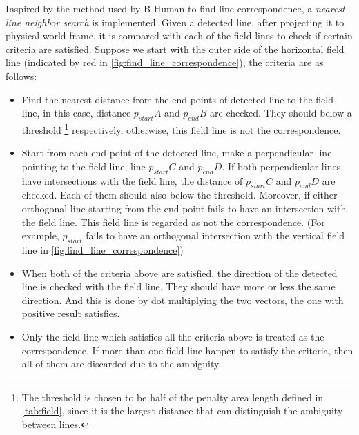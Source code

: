 Inspired by the method used by B-Human \cite{Bhuman} to find line correspondence, a \textit{nearest line neighbor search} is implemented. Given a detected line, after projecting it to physical world frame, it is compared with each of the field lines to check if certain criteria are satisfied. Suppose we start with the outer side of the horizontal field line (indicated by red in
\autoref{fig:find_line_correspondence}), the criteria are as follows:
\begin{itemize}
  \item Find the nearest distance from the end points of detected line to the field line, in this case, distance $p_{start}A$ and $p_{end}B$ are checked. They should below a threshold \footnote{The threshold is chosen to be half of the penalty area length defined in \autoref{tab:field}, since it is the largest distance that can distinguish the ambiguity between lines.} respectively, otherwise, this field line is not the correspondence.
  \item Start from each end point of the detected line, make a perpendicular line pointing to the field line, \ie line $p_{start}C$ and $p_{end}D$. If both perpendicular lines have intersections with the field line, the distance of $p_{start}C$ and $p_{end}D$ are checked. Each of them should also below the threshold. Moreover, if either orthogonal line starting from the end point fails to have an intersection with the field line. This field line is regarded as not the correspondence. (For example, $p_{start}$ fails to have an orthogonal intersection with the vertical field line in \autoref{fig:find_line_correspondence}) 
   \item When both of the criteria above are satisfied, the direction of the detected line is checked with the field line. They should have more or less the same direction. And this is done by dot multiplying the two vectors, the one with positive result satisfies.
   \item Only the field line which satisfies all the criteria above is treated as the correspondence. If more than one field line happen to satisfy the criteria, then all of them are discarded due to the ambiguity.
\end{itemize}


